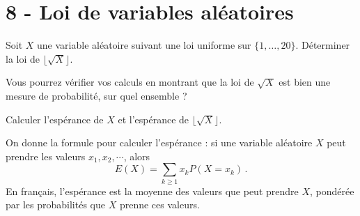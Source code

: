 \vspace{1em}

\section*{8 - Loi de variables aléatoires}
Soit $X$ une variable aléatoire suivant une loi uniforme sur $\{1, \ldots, 20\}$. Déterminer la loi de $\lfloor\sqrt{X}\rfloor$.

Vous pourrez vérifier vos calculs en montrant que la loi de $\sqrt{X}$ est bien une mesure de probabilité, sur quel ensemble ?

Calculer l'espérance de $X$ et l'espérance de $\lfloor\sqrt{X}\rfloor$.

On donne la formule pour calculer l'espérance : si une variable aléatoire $X$ peut prendre les valeurs $x_1, x_2, \cdots$, alors
\[
E(X) =  \sum_{k\geq 1}x_k P(X=x_k)\,. 
\]
En français, l'espérance est la moyenne des valeurs que peut prendre $X$, pondérée par les probabilités que $X$ prenne ces valeurs. 

